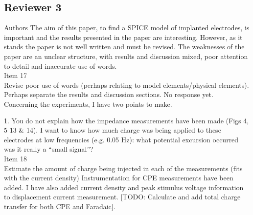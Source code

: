 \documentclass[journal, a4paper]{IEEEtran}
\begin{document}
{\subsection*{Reviewer 3}

{\color{blue}
Authors
The aim of this paper, to find a SPICE model of implanted electrodes, is important and the results presented in the paper are interesting. However, as it stands the paper is not well written and must be revised. The weaknesses of the paper are an unclear structure, with results and discussion mixed, poor attention to detail and inaccurate use of words.\\
{\color{OliveGreen}
    Item 17\\
    {\color{Red} Revise poor use of words (perhaps relating to model elements/physical elements). Perhaps separate the results and discussion sections.} 
    No response yet.
}\\

Concerning the experiments, I have two points to make.

1. You do not explain how the impedance measurements have been made (Figs 4, 5 13 & 14). I want to know how much charge was being applied to these electrodes at low frequencies (e.g. 0.05 Hz): what potential excursion occurred was it really a ``small signal''?\\
{\color{OliveGreen}
    Item 18\\
    {\color{Red} Estimate the amount of charge being injected in each of the measurements (fits with the current density)}
    Instrumentation for CPE measurements have been added. I have also added current density and peak stimulus voltage information to displacement current measurement. [TODO: Calculate and add total charge transfer for both CPE and Faradaic].
}\\

}}
\end{document}
